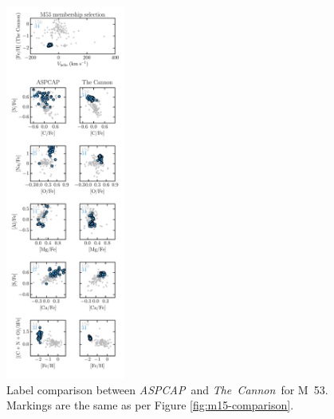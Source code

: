 \documentclass[12pt,preprint]{aastex}
\newcommand{\project}[1]{\textsl{#1}}
\newcommand{\TheCannon}{\project{The~Cannon}}
\newcommand{\acronym}[1]{{\small{#1}}}
\newcommand{\aspcap}{\project{\acronym{ASPCAP}}}
\begin{document}
\begin{figure}[p]
\centering
\includegraphics[width=0.35\textwidth]{M53_comparison.pdf}
\caption{Label comparison between \aspcap\ and \TheCannon\ for M~53.
Markings are the same as per Figure \ref{fig:m15-comparison}.
\label{fig:m53-comparison}}
\end{figure}

\clearpage
\end{document}
